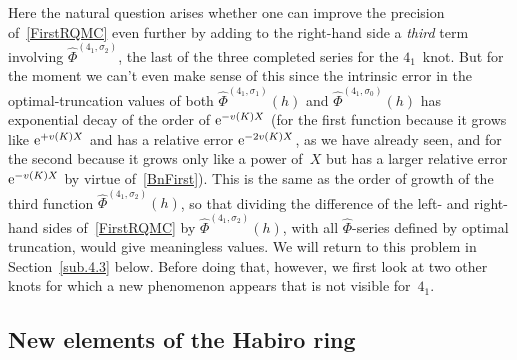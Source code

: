 \documentclass[pdftex]{sigma}
\numberwithin{equation}{section}
\def\Phih{\widehat\Phi}
\def\s{\sigma}
\begin{document}
Here the natural question arises whether one can improve the precision
of~\eqref{FirstRQMC} even further by adding to the right-hand side a \emph{third}
term involving $\Phih^{(4_1,\s_2)}$, the last of the three completed series for the
$4_1$~knot. But for the moment we can't even make sense of this since the intrinsic
error in the optimal-truncation values of both $\Phih^{(4_1,\s_1)}(h)$ and
$\Phih^{(4_1,\s_0)}(h)$ has exponential decay of the order of ${\rm e}^{-v(K)X}$ (for the
first function because it grows like ${\rm e}^{+v(K)X}$ and has a relative error
${\rm e}^{-2v(K)X}$, as we have already seen, and for the second because it grows only
like a power of~$X$ but has a larger relative error ${\rm e}^{-v(K)X}$ by virtue
of~\eqref{BnFirst}). This is the same as the order of growth of the third function
$\Phih^{(4_1,\s_2)}(h)$, so that dividing the difference of the left- and
right-hand sides of~\eqref{FirstRQMC} by $\Phih^{(4_1,\s_2)}(h)$, with all
$\Phih$-series defined by optimal truncation, would give meaningless values. We will
return to this problem in Section~\ref{sub.4.3} below. Before doing
that, however, we first look at two other knots for which a new phenomenon appears
that is not visible for~$4_1 $.

\subsection{New elements of the Habiro ring}
\label{sub.4.2}
\end{document}
